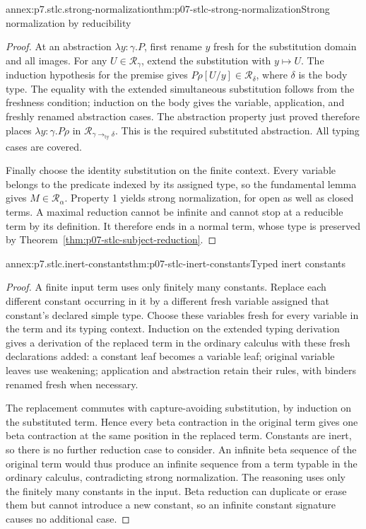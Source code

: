 \begin{annexitem}{annex:p7.stlc.strong-normalization}{thm:p07-stlc-strong-normalization}{Strong normalization by reducibility}
\begin{proof}
At an abstraction \(\lambda y{:}\gamma.P\), first rename \(y\) fresh
for the substitution domain and all images. For any
\(U\in\mathcal R_\gamma\), extend the substitution with \(y\mapsto U\).
The induction hypothesis for the premise gives
\(P\rho[U/y]\in\mathcal R_\delta\), where \(\delta\) is the body type.
The equality with the extended simultaneous substitution follows from the
freshness condition; induction on the body gives the variable, application,
and freshly renamed abstraction cases. The abstraction property just proved
therefore places \(\lambda y{:}\gamma.P\rho\) in
\(\mathcal R_{\gamma\mathbin{\to_{\mathrm{ty}}}\delta}\).
This is the required substituted abstraction. All typing cases are covered.

Finally choose the identity substitution on the finite context. Every
variable belongs to the predicate indexed by its assigned type, so the
fundamental lemma gives \(M\in\mathcal R_\alpha\). Property 1 yields
strong normalization, for open as well as closed terms. A maximal reduction
cannot be infinite and cannot stop at a reducible term by its definition.
It therefore ends in a normal term, whose type is preserved by
Theorem~\ref{thm:p07-stlc-subject-reduction}.
\end{proof}
\end{annexitem}

\begin{annexitem}{annex:p7.stlc.inert-constants}{thm:p07-stlc-inert-constants}{Typed inert constants}
\begin{proof}
A finite input term uses only finitely many constants. Replace each different
constant occurring in it by a different fresh variable assigned that constant's
declared simple type. Choose these variables fresh for every variable in the
term and its typing context. Induction on the extended typing derivation gives
a derivation of the replaced term in the ordinary calculus with these fresh
declarations added: a constant leaf becomes a variable leaf; original variable
leaves use weakening; application and abstraction retain their rules, with
binders renamed fresh when necessary.

The replacement commutes with capture-avoiding substitution, by induction on
the substituted term. Hence every beta contraction in the original term gives
one beta contraction at the same position in the replaced term. Constants
are inert, so there is no further reduction case to consider. An infinite
beta sequence of the original term would thus produce an infinite sequence
from a term typable in the ordinary calculus, contradicting strong
normalization. The reasoning uses only the finitely many constants in the
input. Beta reduction can duplicate or erase them but cannot introduce a
new constant, so an infinite constant signature causes no additional case.
\end{proof}
\end{annexitem}
